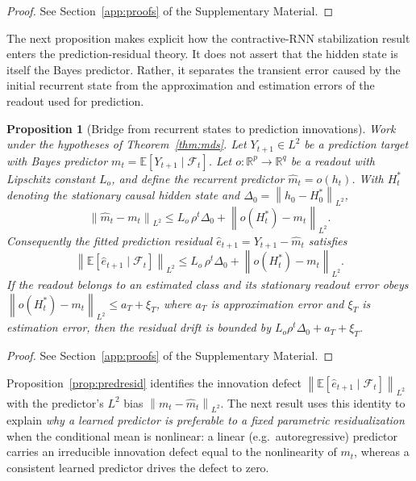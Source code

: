 \documentclass[bj,authoryear]{imsart}
\theoremstyle{plain}
\newtheorem{proposition}[theorem]{Proposition}
\theoremstyle{definition}
\newcommand{\E}{\mathbb{E}}
\newcommand{\R}{\mathbb{R}}
\newcommand{\F}{\mathcal{F}}
\newcommand{\norm}[1]{\left\lVert #1 \right\rVert}
\newcommand{\given}{\mid}
\begin{document}
\begin{proof}
  See Section~\ref{app:proofs} of the Supplementary Material.
\end{proof}

The next proposition makes explicit how the contractive-RNN stabilization
result enters the prediction-residual theory.  It does not assert that the
hidden state is itself the Bayes predictor.  Rather, it separates the
transient error caused by the initial recurrent state from the approximation
and estimation errors of the readout used for prediction.

\begin{proposition}[Bridge from recurrent states to prediction innovations]
\label{prop:rnn-resid-bridge}
  Work under the hypotheses of Theorem~\ref{thm:mds}.  Let
  $Y_{t+1}\in L^2$ be a prediction target with Bayes predictor
  $m_t=\E[Y_{t+1}\given\F_t]$.  Let $o:\R^p\to\R^q$ be a readout with
  Lipschitz constant $L_o$, and define the recurrent predictor
  $\hat m_t=o(h_t)$.  With $H_t^*$ denoting the stationary causal hidden
  state and $\Delta_0=\norm{h_0-H_0^*}_{L^2}$,
  \begin{equation}
    \norm{\hat m_t-m_t}_{L^2}
    \leq
    L_o\,\rho^t\Delta_0
    +
    \norm{o(H_t^*)-m_t}_{L^2}.
    \label{eq:bridge-bound}
  \end{equation}
  Consequently the fitted prediction residual
  $\hat e_{t+1}=Y_{t+1}-\hat m_t$ satisfies
  \begin{equation}
    \norm{\E[\hat e_{t+1}\given\F_t]}_{L^2}
    \leq
    L_o\,\rho^t\Delta_0
    +
    \norm{o(H_t^*)-m_t}_{L^2}.
    \label{eq:bridge-drift}
  \end{equation}
  If the readout belongs to an estimated class and its stationary readout
  error obeys
  $\norm{o(H_t^*)-m_t}_{L^2}\leq a_T+\xi_T$, where $a_T$ is approximation
  error and $\xi_T$ is estimation error, then the residual drift is bounded
  by $L_o\rho^t\Delta_0+a_T+\xi_T$.
\end{proposition}

\begin{proof}
  See Section~\ref{app:proofs} of the Supplementary Material.
\end{proof}

Proposition~\ref{prop:predresid} identifies the innovation defect
$\norm{\E[\hat e_{t+1}\given\F_t]}_{L^2}$ with the predictor's $L^2$ bias
$\norm{m_t-\hat m_t}_{L^2}$.  The next result uses this identity to explain
\emph{why a learned predictor is preferable to a fixed parametric
residualization} when the conditional mean is nonlinear: a linear (e.g.\
autoregressive) predictor carries an irreducible innovation defect equal to
the nonlinearity of $m_t$, whereas a consistent learned predictor drives the
defect to zero.
\end{document}
